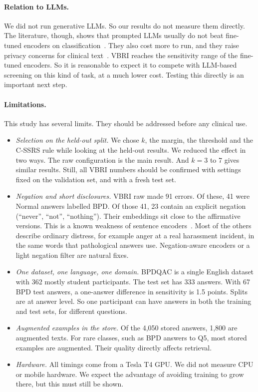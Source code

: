 \documentclass[11pt]{article}
\newcommand{\vbri}{VBRI}
\newcommand{\bpdqac}{BPDQAC}
\begin{document}
\paragraph{Relation to LLMs.}
We did not run generative LLMs. So our results do not measure them directly. The literature,
though, shows that prompted LLMs usually do not beat fine-tuned encoders on
classification~\cite{bucher2024finetuned,edwards2024icl,lho2025jama}. They also cost more to run, and
they raise privacy concerns for clinical text~\cite{guo2024llmreview}. \vbri{} reaches the
sensitivity range of the fine-tuned encoders. So it is reasonable to expect it to compete with
LLM-based screening on this kind of task, at a much lower cost. Testing this directly is an
important next step.

\paragraph{Limitations.}
This study has several limits. They should be addressed before any clinical use.
\begin{itemize}[leftmargin=*,itemsep=2pt]
  \item \emph{Selection on the held-out split.} We chose $k$, the margin, the threshold and the
        C-SSRS rule while looking at the held-out results. We reduced the effect in two ways. The raw
        configuration is the main result. And $k=3$ to 7 gives similar results. Still, all \vbri{}
        numbers should be confirmed with settings fixed on the validation set, and with a fresh
        test set.
  \item \emph{Negation and short disclosures.} \vbri{} raw made 91 errors. Of these, 41 were Normal
        answers labelled BPD. Of those 41, 23 contain an explicit negation (``never'', ``not'',
        ``nothing''). Their embeddings sit close to the affirmative versions. This is a known
        weakness of sentence encoders~\cite{chiang2023heros,cao2025negation}. Most of the others
        describe ordinary distress, for example anger at a real harassment incident, in the same
        words that pathological answers use. Negation-aware encoders or a light negation filter are
        natural fixes.
  \item \emph{One dataset, one language, one domain.} \bpdqac{} is a single English dataset with 362
        mostly student participants. The test set has 333 answers. With 67 BPD test answers, a
        one-answer difference in sensitivity is 1.5 points. Splits are at answer level. So one
        participant can have answers in both the training and test sets, for different questions.
  \item \emph{Augmented examples in the store.} Of the 4,050 stored answers, 1,800 are augmented
        texts. For rare classes, such as BPD answers to Q5, most stored examples are augmented. Their
        quality directly affects retrieval.
  \item \emph{Hardware.} All timings come from a Tesla T4 GPU. We did not measure CPU or mobile
        hardware. We expect the advantage of avoiding training to grow there, but this must still
        be shown.
\end{itemize}
\end{document}
